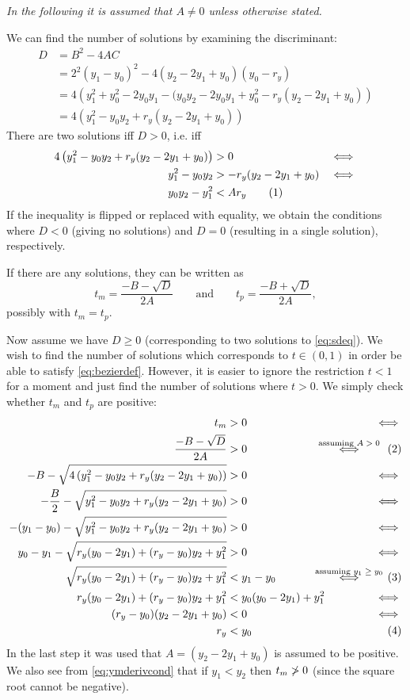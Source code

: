\documentclass[11pt, a4paper]{article}
\newcommand{\numberhere}{\stepcounter{equation}\tag{\theequation}}
\begin{document}
\emph{In the following it is assumed that $A \neq 0$ unless otherwise stated.}

We can find the number of solutions by examining the discriminant:
\begin{align*}
D &= B^2-4AC\\
&= 2^2(y_1 - y_0)^2-4(y_2 - 2y_1 + y_0)(y_0 - r_y)\\
&= 4\left(y_1^2 +y_0^2-2y_0y_1-(y_0y_2 - 2y_0y_1 + y_0^2- r_y(y_2 - 2y_1 + y_0)\right)\\
&= 4\left(y_1^2 - y_0y_2 + r_y(y_2 - 2y_1 + y_0)\right)
\end{align*}
There are two solutions iff $D > 0$, i.e. iff
\begin{align*}
4\left(y_1^2 - y_0y_2 + r_y(y_2 - 2y_1 + y_0)\right) &> 0&\iff\\
y_1^2 - y_0y_2 &> -r_y(y_2 - 2y_1 + y_0)&\iff\\
y_0y_2-y_1^2 &< Ar_y\numberhere\label{eq:posdisc}
\end{align*}
If the inequality is flipped or replaced with equality, we obtain the conditions where $D < 0$ (giving no solutions) and $D = 0$ (resulting in a single solution), respectively.

If there are any solutions, they can be written as
\begin{equation}
\label{eq:ysolformula}
t_m = \frac{-B-\sqrt{D}}{2A}\qquad\text{and}\qquad t_p = \frac{-B+\sqrt{D}}{2A},
\end{equation}
possibly with $t_m = t_p$.

Now assume we have $D \geq 0$ (corresponding to two solutions to \eqref{eq:sdeq}). We wish to find the number of solutions which corresponds to $t \in (0, 1)$ in order be able to satisfy \eqref{eq:bezierdef}. However, it is easier to ignore the restriction $t<1$ for a moment and just find the number of solutions where $t > 0$. We simply check whether $t_m$ and $t_p$ are positive:
\begin{align*}
t_m &> 0 & \iff\\
\frac{-B-\sqrt{D}}{2A} &> 0 &\overset{\mathclap{\text{assuming $A > 0$}}}\iff\numberhere\label{eq:ymderivapos}\\
-B-\sqrt{4\left(y_1^2 - y_0y_2 + r_y(y_2 - 2y_1 + y_0)\right)} &> 0 & \iff\\
-\frac B2 - \sqrt{y_1^2 - y_0y_2 + r_y(y_2 - 2y_1 + y_0)} &> 0 & \iff\\
-(y_1-y_0)-\sqrt{y_1^2 - y_0y_2 + r_y(y_2 - 2y_1 + y_0)} &> 0 & \iff\\
y_0-y_1-\sqrt{r_y(y_0-2y_1)+(r_y-y_0)y_2+y_1^2} &> 0 & \iff\\
\sqrt{r_y(y_0-2y_1)+(r_y-y_0)y_2+y_1^2} &< y_1-y_0 & \overset{\mathclap{\text{assuming $y_1\geq y_0$}}}\iff\numberhere\label{eq:ymderivcond}\\
r_y(y_0-2y_1)+(r_y-y_0)y_2+y_1^2 &< y_0(y_0-2y_1)+y_1^2 &\iff\\
(r_y-y_0)(y_2-2y_1+y_0) &< 0 &\iff\\
r_y &< y_0&\numberhere\label{eq:ymderivend}
\end{align*}
In the last step it was used that $A=(y_2-2y_1+y_0)$ is assumed to be positive. We also see from \eqref{eq:ymderivcond} that if $y_1 < y_2$ then $t_m \centernot> 0$ (since the square root cannot be negative).
\end{document}
